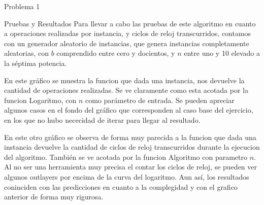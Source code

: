 \begin{section}{Problema 1}
	\begin{subsection}{Pruebas y Resultados}
		Para llevar a cabo las pruebas de este algoritmo en cuanto a operaciones realizadas por instancia, y ciclos de reloj transcurridos, contamos con un generador aleatorio de instancias, que genera instancias completamente aleatorias, con $b$ comprendido entre cero y docientos, y $n$ entre uno y 10 elevado a la séptima potencia.\\
		
		\Pa
		
		En este gráfico se muestra la funcion que dada una instancia, nos devuelve la cantidad de operaciones realizadas. Se ve claramente como esta acotada por la funcion Logaritmo, con $n$ como parámetro de entrada. Se pueden apreciar algunos casos en el fondo del gráfico que corresponden al caso base del ejercicio, en los que no hubo nececidad de iterar para llegar al resultado.



		
		En este otro gráfico se observa de forma muy parecida a la funcion que dada una instancia devuelve la cantidad de ciclos de reloj transcurridos durante la ejecucion del algoritmo. También se ve acotada por la funcion Algoritmo con parametro $n$. Al no ser una herramienta muy precisa el contar los ciclos de reloj, se pueden ver algunos outlayers por encima de la curva del logaritmo. Aun así, los resultados coninciden con las predicciones en cuanto a la complegidad y con el grafico anterior de forma muy rigurosa.

	\end{subsection}

\end{section}

